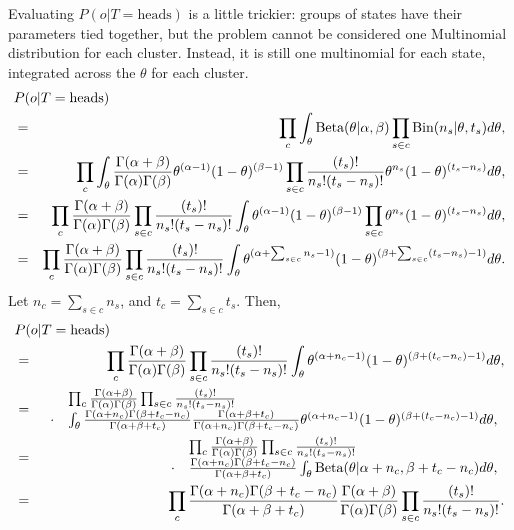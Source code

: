 Evaluating $P(o|T=\mbox{heads})$ is a little trickier: groups of states have their parameters tied together, but the problem cannot be considered one Multinomial distribution for each cluster. Instead, it is still one multinomial for each state, integrated across the $\theta$ for each cluster.
\begin{eqnarray}
\nonumber\lefteqn{P(o|T=\mbox{heads})}\\
 &=& \prod_c \int_\theta \dBeta(\theta|\alpha,\beta) \prod_{s\in c} \dBin(n_s|\theta,t_s) d\theta,\\
 &=&
\prod_c
 \int_\theta
  \frac{\Gamma(\alpha+\beta)}{\Gamma(\alpha)\Gamma(\beta)}
  \theta^{(\alpha-1)}
  (1-\theta)^{(\beta-1)}
 \prod_{s\in c} 
  \frac
  {\left(t_s\right)!}
  {n_s!(t_s-n_s)!} \theta^{n_s}(1-\theta)^{(t_s-n_s)} d\theta,\\
 &=&
\prod_c
  \frac{\Gamma(\alpha+\beta)}{\Gamma(\alpha)\Gamma(\beta)}
 \prod_{s\in c} 
  \frac
  {\left(t_s\right)!}
  {n_s!(t_s-n_s)!}
 \int_\theta
  \theta^{(\alpha-1)}
  (1-\theta)^{(\beta-1)}
 \prod_{s\in c} 
 \theta^{n_s}(1-\theta)^{(t_s-n_s)} d\theta,\\
 &=&
\prod_c
  \frac{\Gamma(\alpha+\beta)}{\Gamma(\alpha)\Gamma(\beta)}
 \prod_{s\in c} 
  \frac
  {\left(t_s\right)!}
  {n_s!(t_s-n_s)!}
 \int_\theta
  \theta^{(\alpha+\sum_{s\in c} n_s-1)}
  (1-\theta)^{(\beta+\sum_{s\in c} (t_s-n_s)-1)} d\theta.
\end{eqnarray}
Let $n_c=\sum_{s\in c} n_s$, and $t_c=\sum_{s\in c} t_s$. Then,
\begin{eqnarray}
\nonumber\lefteqn{P(o|T=\mbox{heads})}\\
 &=&
\prod_c
  \frac{\Gamma(\alpha+\beta)}{\Gamma(\alpha)\Gamma(\beta)}
 \prod_{s\in c} 
  \frac
  {\left(t_s\right)!}
  {n_s!(t_s-n_s)!}
 \int_\theta
  \theta^{(\alpha+n_c-1)}
  (1-\theta)^{(\beta+(t_c-n_c)-1)} d\theta,\\
 &=&
\begin{array}{ll}
&\prod_c
  \frac{\Gamma(\alpha+\beta)}{\Gamma(\alpha)\Gamma(\beta)}
 \prod_{s\in c} 
  \frac
  {\left(t_s\right)!}
  {n_s!(t_s-n_s)!}\\
\cdot & \int_\theta
\frac{\Gamma(\alpha+n_c)\Gamma(\beta+t_c-n_c)}{\Gamma(\alpha+\beta+t_c)}
\frac{\Gamma(\alpha+\beta+t_c)}{\Gamma(\alpha+n_c)\Gamma(\beta+t_c-n_c)}
\theta^{(\alpha+n_c-1)}
  (1-\theta)^{(\beta+(t_c-n_c)-1)} d\theta,
\end{array}\\
 &=&
\begin{array}{ll}
&\prod_c
  \frac{\Gamma(\alpha+\beta)}{\Gamma(\alpha)\Gamma(\beta)}
 \prod_{s\in c} 
  \frac
  {\left(t_s\right)!}
  {n_s!(t_s-n_s)!}\\
\cdot & 
\frac{\Gamma(\alpha+n_c)\Gamma(\beta+t_c-n_c)}{\Gamma(\alpha+\beta+t_c)}
\int_\theta
\dBeta(\theta|\alpha+n_c, \beta+t_c-n_c) d\theta,
\end{array}\\
 &=&
\prod_c
\frac{\Gamma(\alpha+n_c)\Gamma(\beta+t_c-n_c)}{\Gamma(\alpha+\beta+t_c)}
  \frac{\Gamma(\alpha+\beta)}{\Gamma(\alpha)\Gamma(\beta)}
 \prod_{s\in c} 
  \frac
  {\left(t_s\right)!}
  {n_s!(t_s-n_s)!}.
\end{eqnarray}

